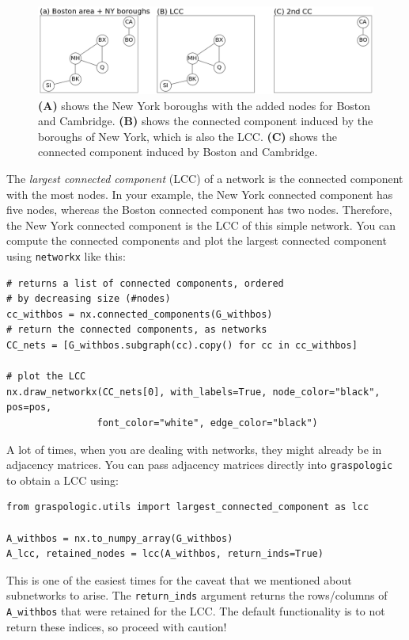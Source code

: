 \begin{figure}[h]
    \centering
    \includegraphics[width=\linewidth]{representations/ch4/Images/lcc.png}
    \caption[Connected Components]{\textbf{(A)} shows the New York boroughs with the added nodes for Boston and Cambridge. \textbf{(B)} shows the connected component induced by the boroughs of New York, which is also the LCC. \textbf{(C)} shows the connected component induced by Boston and Cambridge.}
    \label{fig:ch4:lcc}
\end{figure}
The \textit{largest connected component} (LCC) of a network is the connected component with the most nodes. In your example, the New York connected component has five nodes, whereas the Boston connected component has two nodes. Therefore, the New York connected component is the LCC of this simple network. You can compute the connected components and plot the largest connected component using \texttt{networkx} like this:

\begin{lstlisting}[style=python]
# returns a list of connected components, ordered 
# by decreasing size (#nodes)
cc_withbos = nx.connected_components(G_withbos)
# return the connected components, as networks
CC_nets = [G_withbos.subgraph(cc).copy() for cc in cc_withbos]

# plot the LCC
nx.draw_networkx(CC_nets[0], with_labels=True, node_color="black", pos=pos,
                font_color="white", edge_color="black")
\end{lstlisting}

A lot of times, when you are dealing with networks, they might already be in adjacency matrices. You can pass adjacency matrices directly into \texttt{graspologic} to obtain a LCC using:
\begin{lstlisting}
from graspologic.utils import largest_connected_component as lcc

A_withbos = nx.to_numpy_array(G_withbos)
A_lcc, retained_nodes = lcc(A_withbos, return_inds=True)
\end{lstlisting}
This is one of the {easiest} times for the caveat that we mentioned about subnetworks to arise. The \texttt{return\_inds} argument returns the rows/columns of \texttt{A\_withbos} that were retained for the LCC. The default functionality is to {not} return these indices, so proceed with caution!

